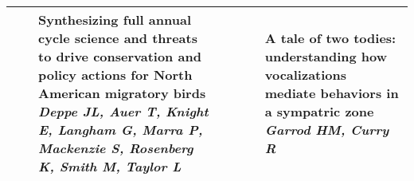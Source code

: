 \begin{tabular}{|x{0.75cm}|a{2.25cm}|a{2.25cm}|a{2.25cm}|a{2.25cm}|a{2.25cm}|x{2.25cm}|}
\hline
{}& \newline \newline \textit{} & Synthesizing full annual cycle science and threats to drive conservation and policy actions for North American migratory birds \newline \newline \textit{Deppe JL, Auer T, Knight E, Langham G, Marra P, Mackenzie S, Rosenberg K, Smith M, Taylor L} &  \newline \newline \textit{} &  \newline \newline \textit{} &  \newline \newline \textit{} & A tale of two todies: understanding how vocalizations mediate behaviors in a sympatric zone \newline \newline \textit{Garrod HM, Curry R}\\
\hline
\end{tabular}
